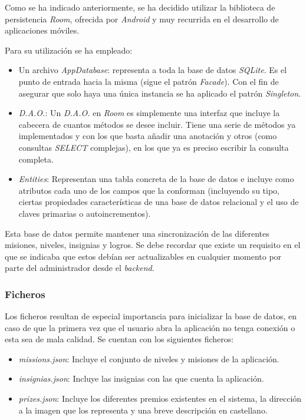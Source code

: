 \documentclass[twoside]{report}
\begin{document}
Como se ha indicado anteriormente, se ha decidido utilizar la biblioteca de persistencia \textit{Room}, ofrecida por \textit{Android} y muy recurrida en el desarrollo de aplicaciones móviles.

Para su utilización se ha empleado:

\begin{itemize}

\item Un archivo \textit{AppDatabase}: representa a toda la base de datos \textit{SQLite}. Es el punto de entrada hacia la misma (sigue el patrón \textit{Facade}). Con el fin de asegurar que solo haya una única instancia se ha aplicado el patrón \textit{Singleton}.

\item \textit{D.A.O.}: Un \textit{D.A.O.} en \textit{Room} es simplemente una interfaz que incluye la cabecera de cuantos métodos se desee incluir. Tiene una serie de métodos ya implementados y con los que basta añadir una anotación y otros (como consultas \textit{SELECT} complejas), en los que ya es preciso escribir la consulta completa.

\item \textit{Entities}: Representan una tabla concreta de la base de datos e incluye como atributos cada uno de los campos que la conforman (incluyendo su tipo, ciertas propiedades características de una base de datos relacional y el uso de claves primarias o autoincrementos).
\end{itemize}

Esta base de datos permite mantener una sincronización de las diferentes misiones, niveles, insignias y logros. Se debe recordar que existe un requisito en el que se indicaba que estos debían ser actualizables en cualquier momento por parte del administrador desde el \textit{backend}.

\subsubsection{Ficheros}

Los ficheros resultan de especial importancia para inicializar la base de datos, en caso de que la primera vez que el usuario abra la aplicación no tenga conexión o esta sea de mala calidad. Se cuentan con los siguientes ficheros:

\begin{itemize}
\item \textit{missions.json}: Incluye el conjunto de niveles y misiones de la aplicación. 

\item \textit{insignias.json}: Incluye las insignias con las que cuenta la aplicación.

\item \textit{prizes.json}: Incluye los diferentes premios existentes en el sistema, la dirección a la imagen que los representa y una breve descripción en castellano.

\end{itemize}
\end{document}

